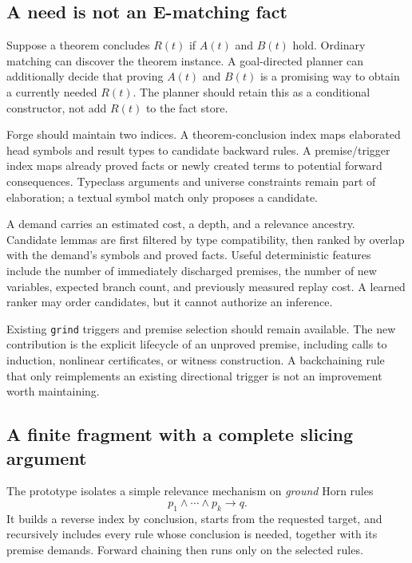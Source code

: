 \documentclass[11pt,letterpaper]{article}
\newcommand{\Forge}{\textsf{Forge}}
\newcommand{\grind}{\texttt{grind}}
\theoremstyle{definition}
\theoremstyle{remark}
\begin{document}
\subsection{A need is not an E-matching fact}
Suppose a theorem concludes $R(t)$ if $A(t)$ and $B(t)$ hold. Ordinary matching can discover the theorem instance. A goal-directed planner can additionally decide that proving $A(t)$ and $B(t)$ is a promising way to obtain a currently needed $R(t)$. The planner should retain this as a conditional constructor, not add $R(t)$ to the fact store.

\Forge{} should maintain two indices. A theorem-conclusion index maps elaborated head symbols and result types to candidate backward rules. A premise/trigger index maps already proved facts or newly created terms to potential forward consequences. Typeclass arguments and universe constraints remain part of elaboration; a textual symbol match only proposes a candidate.

A demand carries an estimated cost, a depth, and a relevance ancestry. Candidate lemmas are first filtered by type compatibility, then ranked by overlap with the demand's symbols and proved facts. Useful deterministic features include the number of immediately discharged premises, the number of new variables, expected branch count, and previously measured replay cost. A learned ranker may order candidates, but it cannot authorize an inference.

Existing \grind{} triggers and premise selection should remain available. The new contribution is the explicit lifecycle of an unproved premise, including calls to induction, nonlinear certificates, or witness construction. A backchaining rule that only reimplements an existing directional trigger is not an improvement worth maintaining.

\subsection{A finite fragment with a complete slicing argument}
The prototype isolates a simple relevance mechanism on \emph{ground} Horn rules
\[
p_1\land\cdots\land p_k\to q.
\]
It builds a reverse index by conclusion, starts from the requested target, and recursively includes every rule whose conclusion is needed, together with its premise demands. Forward chaining then runs only on the selected rules.
\end{document}
